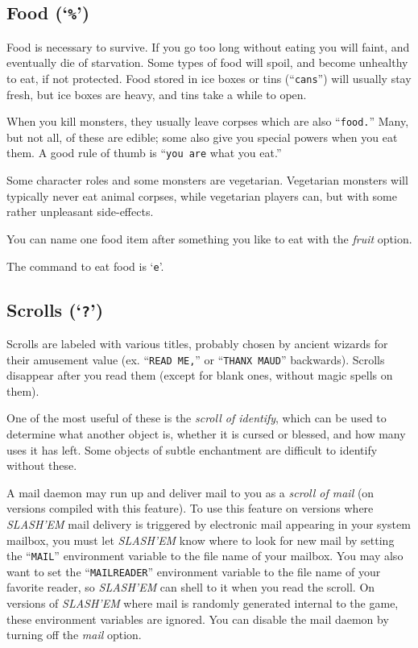 \subsection*{Food (`{\tt \%}')}


Food is necessary to survive.  If you go too long without eating you
will faint, and eventually die of starvation.  Some types of food will
spoil, and become unhealthy to eat, if not protected.  Food stored in
ice boxes or tins (``{\tt cans}'') will usually stay fresh, but
ice boxes are heavy, and tins take a while to open.

When you kill monsters, they usually leave corpses which are also
``{\tt food.}''  Many, but not all, of these are edible; some also give you
special powers when you eat them.  A good rule of thumb is ``{\tt you are}
what you eat.''

Some character roles and some monsters are vegetarian.  Vegetarian monsters
will typically never eat animal corpses, while vegetarian players can,
but with some rather unpleasant side-effects.

You can name one food item after something you like to eat with the
{\it fruit\/} 
option.

The command to eat food is `{\tt e}'.
\subsection*{Scrolls (`{\tt ?}')}


Scrolls are labeled with various titles, probably chosen by ancient wizards
for their amusement value (ex. ``{\tt READ ME,}'' or ``{\tt THANX MAUD}'' backwards).
Scrolls disappear after you read them (except for blank ones, without
magic spells on them).

One of the most useful of these is the {\it scroll of identify}, which
can be used to determine what another object is, whether it is cursed or
blessed, and how many uses it has left.  Some objects of subtle
enchantment are difficult to identify without these.

A mail daemon may run up and deliver mail to you as a
{\it scroll of mail\/} (on versions compiled with this feature).
To use this feature on versions where {\it SLASH'EM\/} mail delivery is triggered
by electronic mail appearing in your system mailbox,
you must let {\it SLASH'EM\/} know where to look for new mail by setting
the ``{\tt MAIL}'' environment variable to the file name of your mailbox.
You may also want to set the ``{\tt MAILREADER}'' environment
variable to the file name of your favorite reader, so {\it SLASH'EM\/} can shell to it
when you read the scroll.
On versions of {\it SLASH'EM\/} where mail is randomly generated internal to the game,
these environment variables are ignored.
You can disable the mail daemon by turning off the
{\it mail\/} 
option.

